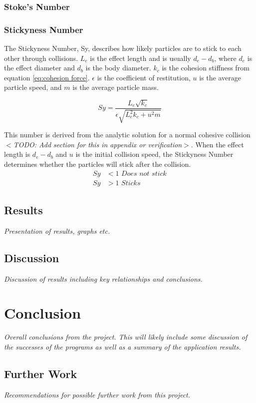 \documentclass[10pt,a4paper,titlepage]{report}
\begin{document}
\subsection{Stoke's Number}
\subsection{Stickyness Number}
The Stickyness Number, Sy, describes how likely particles are to stick to each other through collisions. $L_e$ is the effect length and is usually $d_e - d_b$, where $d_e$ is the effect diameter and $d_b$ is the body diameter. $k_c$ is the cohesion stiffness from equation \ref{eq:cohesion force}. $\epsilon$ is the coefficient of restitution, $u$ is the average particle speed, and $m$ is the average particle mass.

\begin{equation}
Sy = \dfrac{L_e \sqrt{k_c}}{\epsilon \sqrt{L_e^2 k_c + u^2 m}}
\end{equation}

This number is derived from the analytic solution for a normal cohesive collision $<$\textit{TODO: Add section for this in appendix or verification}$>$. When the effect length is $d_e - d_b$ and $u$ is the initial collision speed, the Stickyness Number determines whether the particles will stick after the collision.
\begin{align*}
Sy &< 1 \textit{ Does not stick}
\\ Sy & > 1 \textit{ Sticks}
\end{align*}
\section{Results}
\textit{Presentation of results, graphs etc.}
\section{Discussion}
\textit{Discussion of results including key relationships and conclusions.}
\chapter{Conclusion}
\textit{Overall conclusions from the project. This will likely include some discussion of the successes of the programs as well as a summary of the application results.}
\section{Further Work}
\textit{Recommendations for possible further work from this project.}
\appendix
\end{document}
